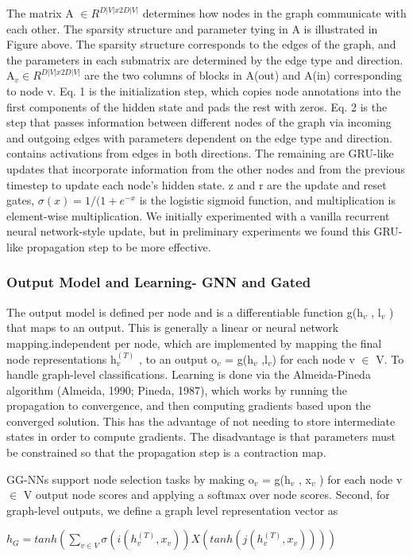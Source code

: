 \documentclass{article}
\begin{document}
The matrix A $\in R^{D|V|x2D|V|}$ determines how nodes in the graph communicate with each other. The sparsity structure and parameter tying in A is illustrated in Figure above. The sparsity structure corresponds to the edges of the graph, and the parameters in each submatrix are determined by the edge type and direction. A$_v \in R^{D|V|x2D|V|}$ are the two columns of blocks in A(out) and A(in) corresponding to node v. Eq. 1 is the initialization step, which copies node annotations into the first components of the hidden state and pads the rest with zeros. Eq. 2 is the step that passes information between different nodes of the graph via incoming and outgoing edges with parameters dependent on the edge type and direction. contains activations from edges in both directions. The remaining are GRU-like updates that incorporate information from the other nodes and from the previous timestep to update each node’s hidden state. z and r are the update and reset gates, $\sigma(x) = 1/(1+e^{-x}$ is the logistic sigmoid function, and multiplication is element-wise multiplication. We initially experimented with a vanilla recurrent neural network-style update, but in preliminary experiments we found this GRU-like propagation step to be more effective.
\subsubsection{Output Model and Learning- GNN and Gated}
The output model is defined per node and is a differentiable function g(h$_v$ , l$_v$ ) that maps to an output. This is generally a linear or neural network mapping.independent per node, which are implemented by mapping the final node representations h$_v^{(T)}$ , to an output o$_v$ = g(h$_v$ ,l$_v$) for each node v $\in$ V. To handle graph-level classifications. Learning is done via the Almeida-Pineda algorithm (Almeida, 1990; Pineda, 1987), which works by running the propagation to convergence, and then computing gradients based upon the converged solution. This has the advantage of not needing to store intermediate states in order to compute gradients. The disadvantage is that parameters must be constrained so that the propagation step is a contraction map.

GG-NNs support node selection tasks by making o$_v$ = g(h$_v$ , x$_v$ ) for each node v $\in$ V output node scores and applying a softmax over node scores. Second, for graph-level outputs, we define a graph level representation vector as

\begin{math}
h_G = tanh(\sum_{v \in V} \sigma(i(h_v^{(T)},x_v))X(tanh(j(h_v^{(T)},x_v))))
\end{math}
\end{document}
